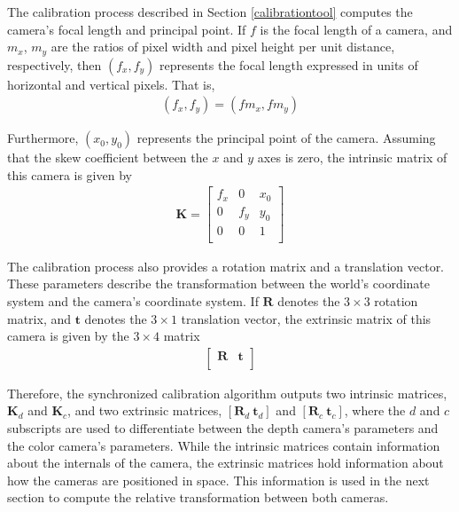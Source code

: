 The calibration process described in Section \ref{calibrationtool} computes the camera's focal length and 
principal point. If $f$ is the focal length of a camera, and $m_x$, $m_y$ are the ratios of pixel width and pixel 
height per unit distance, respectively, then $(f_x, f_y)$ represents the focal length expressed in units of 
horizontal and vertical pixels. That is, 
\begin{align}
(f_x, f_y) = ( f m_x , f m_y)
\end{align}

Furthermore, $(x_0, y_0)$ represents the principal point of the camera. Assuming that the skew coefficient 
between the $x$ and $y$ axes is zero, the intrinsic matrix of this camera is given by 
\begin{align} \label{intrinsicmatrix}
\mathbf{K} = \begin{bmatrix}
	f_x & 0    & x_0 \\
	0    & f_y & y_0 \\
	0    & 0    & 1      \\
\end{bmatrix}
\end{align}

The calibration process also provides a rotation matrix and a translation vector. These parameters describe
the transformation between the world's coordinate system and the camera's coordinate system. If 
$\mathbf{R}$ denotes the $3 \times 3$ rotation matrix, and $\mathbf{t}$ denotes the $3 \times 1$ 
translation vector, the extrinsic matrix of this camera is given by the $3 \times 4$ matrix 
\begin{align} \label{extrinsicmatrix}
\begin{bmatrix} \mathbf{R} & \mathbf{t} \\ \end{bmatrix}
\end{align}

Therefore, the synchronized calibration algorithm outputs two intrinsic matrices, $\mathbf{K}_d$ and 
$\mathbf{K}_c$, and two extrinsic matrices, $[ \mathbf{R}_d ~ \mathbf{t}_d ]$ and 
$[ \mathbf{R}_c ~ \mathbf{t}_c ]$, where the $d$ and $c$ subscripts are used to differentiate between the 
depth camera's parameters and the color camera's parameters. While the intrinsic matrices contain 
information about the internals of the camera, the extrinsic matrices hold information about how the 
cameras are positioned in space. This information is used in the next section to compute the relative 
transformation between both cameras. 


